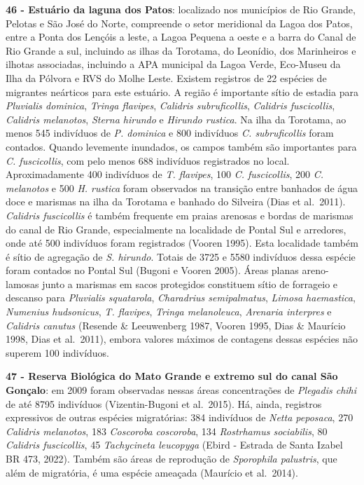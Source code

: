 \documentclass[
  oneside]{scrbook}
\begin{document}
\textbf{46 - Estuário da laguna dos Patos}: localizado nos municípios de Rio Grande, Pelotas e São José do Norte, compreende o setor meridional da Lagoa dos Patos, entre a Ponta dos Lençóis a leste, a Lagoa Pequena a oeste e a barra do Canal de Rio Grande a sul, incluindo as ilhas da Torotama, do Leonídio, dos Marinheiros e ilhotas associadas, incluindo a APA municipal da Lagoa Verde, Eco-Museu da Ilha da Pólvora e RVS do Molhe Leste. Existem registros de 22 espécies de migrantes neárticos para este estuário. A região é importante sítio de estadia para \emph{Pluvialis dominica}, \emph{Tringa flavipes}, \emph{Calidris subruficollis}, \emph{Calidris fuscicollis}, \emph{Calidris melanotos}, \emph{Sterna hirundo} e \emph{Hirundo rustica}. Na ilha da Torotama, ao menos 545 indivíduos de \emph{P. dominica} e 800 indivíduos \emph{C. subruficollis} foram contados. Quando levemente inundados, os campos também são importantes para \emph{C. fuscicollis}, com pelo menos 688 indivíduos registrados no local. Aproximadamente 400 indivíduos de \emph{T. flavipes}, 100 \emph{C. fuscicollis}, 200 \emph{C. melanotos} e 500 \emph{H. rustica} foram observados na transição entre banhados de água doce e marismas na ilha da Torotama e banhado do Silveira (Dias et al.~2011). \emph{Calidris fuscicollis} é também frequente em praias arenosas e bordas de marismas do canal de Rio Grande, especialmente na localidade de Pontal Sul e arredores, onde até 500 indivíduos foram registrados (Vooren 1995). Esta localidade também é sítio de agregação de \emph{S. hirundo}. Totais de 3725 e 5580 indivíduos dessa espécie foram contados no Pontal Sul (Bugoni e Vooren 2005). Áreas planas areno-lamosas junto a marismas em sacos protegidos constituem sítio de forrageio e descanso para \emph{Pluvialis squatarola}, \emph{Charadrius semipalmatus}, \emph{Limosa haemastica}, \emph{Numenius hudsonicus}, \emph{T. flavipes}, \emph{Tringa melanoleuca}, \emph{Arenaria interpres} e \emph{Calidris canutus} (Resende \& Leeuwenberg 1987, Vooren 1995, Dias \& Maurício 1998, Dias et al.~2011), embora valores máximos de contagens dessas espécies não superem 100 indivíduos.

\textbf{47 - Reserva Biológica do Mato Grande e extremo sul do canal São Gonçalo}: em 2009 foram observadas nessas áreas concentrações de \emph{Plegadis chihi} de até 8795 indivíduos (Vizentin-Bugoni et al.~2015). Há, ainda, registros expressivos de outras espécies migratórias: 384 indivíduos de \emph{Netta peposaca}, 270 \emph{Calidris melanotos}, 183 \emph{Coscoroba coscoroba}, 134 \emph{Rostrhamus sociabilis}, 80 \emph{Calidris fuscicollis}, 45 \emph{Tachycineta leucopyga} (Ebird - Estrada de Santa Izabel BR 473, 2022). Também são áreas de reprodução de \emph{Sporophila palustris}, que além de migratória, é uma espécie ameaçada (Maurício et al.~2014).
\end{document}
